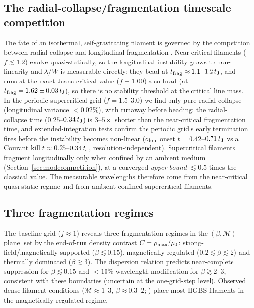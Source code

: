 \documentclass[usenatbib,twoside,twocolumn]{mnras}
\begin{document}
\subsection{The radial-collapse/fragmentation timescale competition}
\label{sec:regimes}

The fate of an isothermal, self-gravitating filament is governed by the competition between radial collapse and longitudinal fragmentation \citep{Inutsuka1997,Pon2012}. Near-critical filaments ($f\lesssim1.2$) evolve quasi-statically, so the longitudinal instability grows to non-linearity and $\lambda/W$ is measurable directly; they bead at $t_{\rm frag}\approx1.1$--$1.2\,t_{\rm J}$, and runs at the exact Jeans-critical value ($f=1.00$) also bead (at $t_{\rm frag}=1.62\pm0.03\,t_{\rm J}$), so there is no stability threshold at the critical line mass. In the periodic supercritical grid ($f=1.5$--$3.0$) we find only pure radial collapse (longitudinal variance $<0.02\%$), with runaway before beading: the radial-collapse time ($0.25$--$0.34\,t_{\rm J}$) is $3$--$5\times$ shorter than the near-critical fragmentation time, and extended-integration tests confirm the periodic grid's early termination fires before the instability becomes non-linear ($\sigma_{\rm lon}$ onset $t=0.42$--$0.71\,t_{\rm J}$ vs a Courant kill $t\approx0.25$--$0.34\,t_{\rm J}$, resolution-independent). Supercritical filaments fragment longitudinally only when confined by an ambient medium (Section~\ref{sec:modecompetition}), at a converged \emph{upper bound} $\lesssim0.5$ times the classical value. The measurable wavelengths therefore come from the near-critical quasi-static regime and from ambient-confined supercritical filaments.

\subsection{Three fragmentation regimes}

The baseline grid ($f\approx1$) reveals three fragmentation regimes in the $(\beta,\mathcal{M})$ plane, set by the end-of-run density contrast $C=\rho_{\rm max}/\rho_0$: strong-field/magnetically supported ($\beta\lesssim0.15$), magnetically regulated ($0.2\lesssim\beta\lesssim2$) and thermally dominated ($\beta\gtrsim3$). The dispersion relation \citep{Nakamura1993} predicts near-complete suppression for $\beta\lesssim0.15$ and $<10\%$ wavelength modification for $\beta\gtrsim2$--$3$, consistent with these boundaries (uncertain at the one-grid-step level). Observed dense-filament conditions ($\mathcal{M}\approx1$--$3$, $\beta\approx0.3$--$2$; \citealt{Arzoumanian2019,Planck2016,Pattle2018}) place most HGBS filaments in the magnetically regulated regime.
\end{document}
